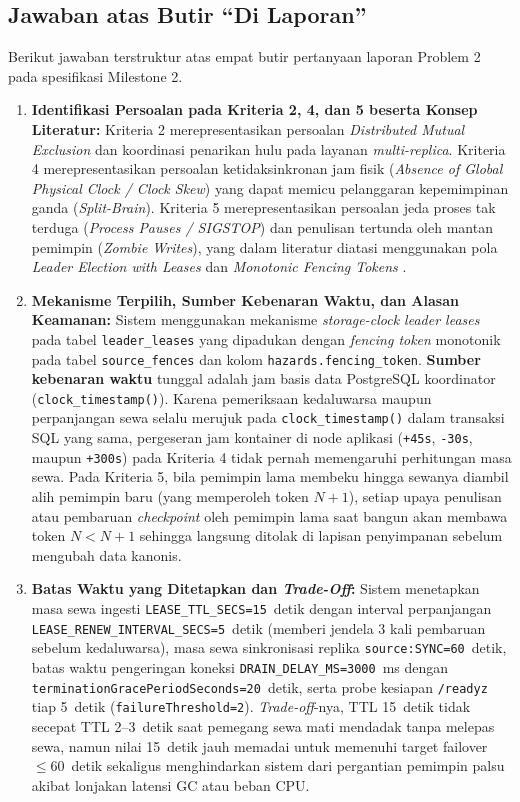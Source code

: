 \subsection{Jawaban atas Butir ``Di Laporan''}
Berikut jawaban terstruktur atas empat butir pertanyaan laporan Problem 2 pada spesifikasi Milestone 2.
\begin{enumerate}
    \item \textbf{Identifikasi Persoalan pada Kriteria 2, 4, dan 5 beserta Konsep Literatur:} Kriteria 2 merepresentasikan persoalan \textit{Distributed Mutual Exclusion} dan koordinasi penarikan hulu pada layanan \textit{multi-replica}. Kriteria 4 merepresentasikan persoalan ketidaksinkronan jam fisik (\textit{Absence of Global Physical Clock / Clock Skew}) yang dapat memicu pelanggaran kepemimpinan ganda (\textit{Split-Brain}). Kriteria 5 merepresentasikan persoalan jeda proses tak terduga (\textit{Process Pauses / SIGSTOP}) dan penulisan tertunda oleh mantan pemimpin (\textit{Zombie Writes}), yang dalam literatur diatasi menggunakan pola \textit{Leader Election with Leases} dan \textit{Monotonic Fencing Tokens} \cite{kleppmann2017designing}.
    \item \textbf{Mekanisme Terpilih, Sumber Kebenaran Waktu, dan Alasan Keamanan:} Sistem menggunakan mekanisme \textit{storage-clock leader leases} pada tabel \texttt{leader\_leases} yang dipadukan dengan \textit{fencing token} monotonik pada tabel \texttt{source\_fences} dan kolom \texttt{hazards.fencing\_token}. \textbf{Sumber kebenaran waktu} tunggal adalah jam basis data PostgreSQL koordinator (\texttt{clock\_timestamp()}). Karena pemeriksaan kedaluwarsa maupun perpanjangan sewa selalu merujuk pada \texttt{clock\_timestamp()} dalam transaksi SQL yang sama, pergeseran jam kontainer di node aplikasi (\texttt{+45s}, \texttt{-30s}, maupun \texttt{+300s}) pada Kriteria 4 tidak pernah memengaruhi perhitungan masa sewa. Pada Kriteria 5, bila pemimpin lama membeku hingga sewanya diambil alih pemimpin baru (yang memperoleh token $N+1$), setiap upaya penulisan atau pembaruan \textit{checkpoint} oleh pemimpin lama saat bangun akan membawa token $N < N+1$ sehingga langsung ditolak di lapisan penyimpanan sebelum mengubah data kanonis.
    \item \textbf{Batas Waktu yang Ditetapkan dan \textit{Trade-Off}:} Sistem menetapkan masa sewa ingesti \texttt{LEASE\_TTL\_SECS=15}~detik dengan interval perpanjangan \texttt{LEASE\_RENEW\_INTERVAL\_SECS=5}~detik (memberi jendela 3 kali pembaruan sebelum kedaluwarsa), masa sewa sinkronisasi replika \texttt{source:SYNC=60}~detik, batas waktu pengeringan koneksi \texttt{DRAIN\_DELAY\_MS=3000}~ms dengan \texttt{terminationGracePeriodSeconds=20}~detik, serta probe kesiapan \texttt{/readyz} tiap 5~detik (\texttt{failureThreshold=2}). \textit{Trade-off}-nya, TTL 15~detik tidak secepat TTL 2--3~detik saat pemegang sewa mati mendadak tanpa melepas sewa, namun nilai 15~detik jauh memadai untuk memenuhi target failover $\le 60$~detik sekaligus menghindarkan sistem dari pergantian pemimpin palsu akibat lonjakan latensi GC atau beban CPU.

\end{enumerate}
